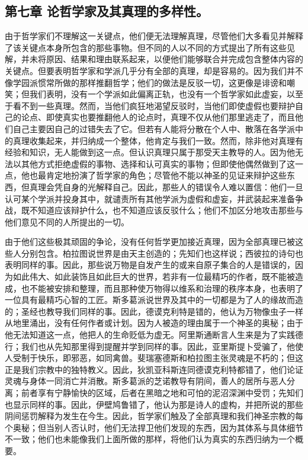 \subsection{第七章 论哲学家及其真理的多样性。}

由于哲学家们不理解这一关键点，他们便无法理解真理，尽管他们大多看见并解释了该关键点本身所包含的那些事物。但不同的人以不同的方式提出了所有这些见解，并未将原因、结果和理由联系起来，以便他们能够联合并完成包含整体内容的关键点。但要表明哲学家和学派几乎分有全部的真理，却是容易的。因为我们并不像学园派惯常所做的那样推翻哲学；他们的做法是反驳一切，这更像是诽谤和嘲笑；但我们表明，没有一个学派如此偏离正轨，也没有一个哲学家如此虚妄，以至于看不到一些真理。然而，当他们疯狂地渴望反驳时，当他们即使虚假也要辩护自己的论点、即使真实也要推翻他人的论点时，真理不仅从他们那里逃走了，而且他们自己主要因自己的过错失去了它。但若有人能将分散在个人中、散落在各学派中的真理收集起来，并归纳成一个整体，他肯定与我们一致。然而，除非他对真理有经验和知识，无人能做到这一点。但认识真理只属于那受天主教导的人。因为他无法以其他方式拒绝虚假的事物、选择和认可真实的事物；但即使他偶然做到了这一点，他也最肯定地扮演了哲学家的角色；尽管他不能以神圣的见证来辩护这些东西，但真理会凭自身的光解释自己。因此，那些人的错误令人难以置信：他们一旦认可某个学派并投身其中，就谴责所有其他学派为虚假和虚妄，并武装起来准备争战，既不知道应该辩护什么，也不知道应该反驳什么；他们不加区分地攻击那些与他们意见不同的人所提出的一切。\par

由于他们这些极其顽固的争论，没有任何哲学更加接近真理，因为全部真理已被这些人分别包含。柏拉图说世界是由天主创造的；先知们也这样说；西彼拉的诗句也表明同样的事。因此，那些说万物是自发产生的或来自原子集合的人是错误的，因为如此伟大、如此装饰且如此巨大的世界，若非有一位最精巧的作者，既不能被造成，也不能被安排和整理，而且那种使万物得以维系和治理的秩序本身，也表明了一位具有最精巧心智的工匠。斯多葛派说世界及其中的一切都是为了人的缘故而造的；圣经也教导我们同样的事。因此，德谟克利特是错的，他认为万物像虫子一样从地里涌出，没有任何作者或计划。因为人被造的理由属于一个神圣的奥秘；由于他无法知道这一点，他把人的生命贬低为虚无。阿里斯通断言人生来是为了实践德行；我们也从先知那里得到提醒并学到同样的事。因此，亚里斯提卜受骗了，他使人受制于快乐，即邪恶，如同禽兽。斐瑞塞德斯和柏拉图主张灵魂是不朽的；但这正是我们宗教中的独特教义。因此，狄凯亚科斯连同德谟克利特都错了，他们论证灵魂与身体一同消亡并消散。斯多葛派的芝诺教导有阴间，善人的居所与恶人分离；前者享有宁静愉快的区域，后者在黑暗之地和可怕的泥沼深渊中受罚；先知们也显示同样的事。因此，伊壁鸠鲁错了，他认为那是诗人的虚构，并把所说的那些阴间惩罚解释为发生在今生。因此，哲学家们触及了全部真理和我们神圣宗教的每个奥秘；但当别人否认时，他们无法捍卫他们发现的东西，因为其体系与具体细节不一致；他们也未能像我们上面所做的那样，将他们认为真实的东西归纳为一个概要。\par

